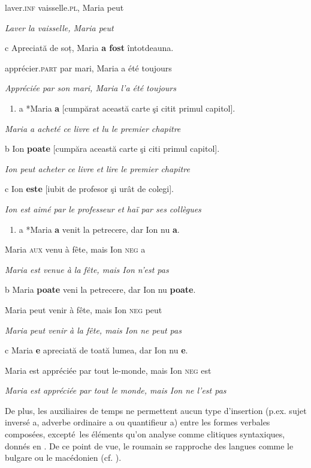     laver.\textsc{inf } vaisselle\textsc{.pl, } Maria  peut

    \textit{Laver la vaisselle, Maria peut}

  c  Apreciată  de  soț,  Maria  \textbf{a  fost}  întotdeauna.

    apprécier.\textsc{part } par mari,  Maria  a été  toujours 

{\itshape
Appréciée par son mari, Maria l'a été toujours}


\begin{enumerate}
\item \label{bkm:Ref299280142}a  *Maria \textbf{a} [cumpărat această carte şi citit primul capitol].


\end{enumerate}
    \textit{Maria a acheté ce livre et lu le premier chapitre}  

  b  Ion \textbf{poate} [cumpăra această carte şi citi primul capitol].

    \textit{Ion peut acheter ce livre et lire le premier chapitre}

  c  Ion \textbf{este} [iubit de profesor şi urât de colegi].

    \textit{Ion est aimé par le professeur et haï par ses collègues}


\begin{enumerate}
\item \label{bkm:Ref299280145}a  *Maria  \textbf{a } venit  la  petrecere,  dar  Ion  nu  \textbf{a}.


\end{enumerate}
Maria  \textsc{aux}  venu à  fête,  mais  Ion  \textsc{neg } a

    \textit{Maria est venue à la fête, mais Ion n'est pas}  

  b  Maria  \textbf{poate}  veni  la  petrecere,  dar  Ion  nu  \textbf{poate}.

    Maria  peut  venir  à  fête,  mais  Ion  \textsc{neg } peut

    \textit{Maria peut venir à la fête, mais Ion ne peut pas}

  c  Maria  \textbf{e}  apreciată  de  toată  lumea,  dar  Ion  nu  \textbf{e}.  

    Maria  est  appréciée  par  tout  le-monde,  mais  Ion  \textsc{neg } est

{\itshape
Maria est appréciée par tout le monde, mais Ion ne l'est pas } 

De plus, les auxiliaires de temps ne permettent aucun type d'insertion (p.ex. sujet inversé a, adverbe ordinaire a ou quantifieur a) entre les formes verbales composées, excepté~les éléments qu'on analyse comme clitiques syntaxiques, donnés en . De ce point de vue, le roumain se rapproche des langues comme le bulgare ou le macédonien (cf. \citet{Legendre2000}).


